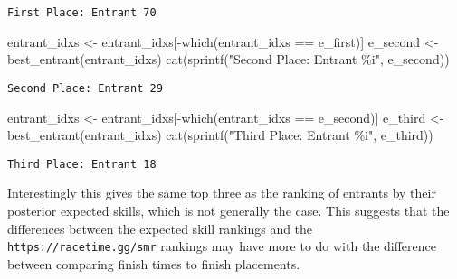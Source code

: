 \documentclass[
  letterpaper,
  DIV=11,
  numbers=noendperiod]{scrartcl}
\newenvironment{Shaded}{\begin{snugshade}}{\end{snugshade}}
\newcommand{\DecValTok}[1]{\textcolor[rgb]{0.68,0.00,0.00}{#1}}
\newcommand{\FunctionTok}[1]{\textcolor[rgb]{0.28,0.35,0.67}{#1}}
\newcommand{\NormalTok}[1]{\textcolor[rgb]{0.00,0.23,0.31}{#1}}
\newcommand{\OtherTok}[1]{\textcolor[rgb]{0.00,0.23,0.31}{#1}}
\newcommand{\SpecialCharTok}[1]{\textcolor[rgb]{0.37,0.37,0.37}{#1}}
\newcommand{\StringTok}[1]{\textcolor[rgb]{0.13,0.47,0.30}{#1}}
\begin{document}
\begin{Shaded}
\end{Shaded}

\begin{verbatim}
First Place: Entrant 70
\end{verbatim}

\begin{Shaded}
\begin{Highlighting}[]
\NormalTok{entrant\_idxs }\OtherTok{\textless{}{-}}\NormalTok{ entrant\_idxs[}\SpecialCharTok{{-}}\FunctionTok{which}\NormalTok{(entrant\_idxs }\SpecialCharTok{==}\NormalTok{ e\_first)]}
\NormalTok{e\_second }\OtherTok{\textless{}{-}} \FunctionTok{best\_entrant}\NormalTok{(entrant\_idxs)}
\FunctionTok{cat}\NormalTok{(}\FunctionTok{sprintf}\NormalTok{(}\StringTok{"Second Place: Entrant \%i"}\NormalTok{, e\_second))}
\end{Highlighting}
\end{Shaded}

\begin{verbatim}
Second Place: Entrant 29
\end{verbatim}

\begin{Shaded}
\begin{Highlighting}[]
\NormalTok{entrant\_idxs }\OtherTok{\textless{}{-}}\NormalTok{ entrant\_idxs[}\SpecialCharTok{{-}}\FunctionTok{which}\NormalTok{(entrant\_idxs }\SpecialCharTok{==}\NormalTok{ e\_second)]}
\NormalTok{e\_third }\OtherTok{\textless{}{-}} \FunctionTok{best\_entrant}\NormalTok{(entrant\_idxs)}
\FunctionTok{cat}\NormalTok{(}\FunctionTok{sprintf}\NormalTok{(}\StringTok{"Third Place: Entrant \%i"}\NormalTok{, e\_third))}
\end{Highlighting}
\end{Shaded}

\begin{verbatim}
Third Place: Entrant 18
\end{verbatim}

Interestingly this gives the same top three as the ranking of entrants
by their posterior expected skills, which is not generally the case.
This suggests that the differences between the expected skill rankings
and the \texttt{https://racetime.gg/smr} rankings may have more to do
with the difference between comparing finish times to finish placements.
\end{document}
